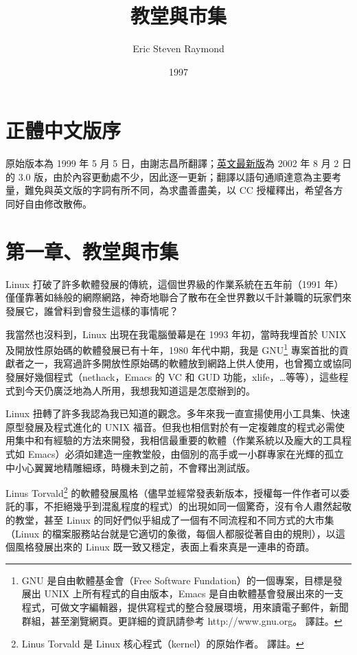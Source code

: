 \documentclass[12pt,]{article}
\title{教堂與市集}
\author{Eric Steven Raymond}
\date{1997}
\makeatletter
\newcommand*{\shifttext}[2]{%
  \settowidth{\@tempdima}{#2}%
  \makebox[\@tempdima]{\hspace*{#1}#2}%
}
\makeatother
\begin{document}
\maketitle

\newpage
\section{正體中文版序}

原始版本為 1999 年 5 月 5
日，由謝志昌所翻譯；\href{http://www.catb.org/esr/writings/homesteading/cathedral-bazaar/}{英文最新版}為
2002 年 8 月 2 日的 3.0
版，由於內容更動處不少，因此逐一更新；翻譯以語句通順達意為主要考量，難免與英文版的字詞有所不同，為求盡善盡美，以
CC 授權釋出，希望各方同好自由修改散佈。

\newpage
\section{第一章、教堂與市集}

Linux 打破了許多軟體發展的傳統，這個世界級的作業系統在五年前（1991
年）僅僅靠著如絲般的網際網路，神奇地聯合了散布在全世界數以千計兼職的玩家們來發展它，誰曾料到會發生這樣的事情呢？

我當然也沒料到，Linux 出現在我電腦螢幕是在 1993 年初，當時我埋首於 UNIX
及開放性原始碼的軟體發展已有十年，1980 年代中期，我是 GNU\footnote{GNU
  是自由軟體基金會（Free Software Fundation）的一個專案，目標是發展出 UNIX
  上所有程式的自由版本，Emacs
  是自由軟體基會發展出來的一支程式，可做文字編輯器，提供寫程式的整合發展環境，用來讀電子郵件，新聞群組，甚至瀏覽網頁。更詳細的資訊請參考
  http://www.gnu.org。 \shifttext{1pt}{---}\shifttext{-1pt}{---} 譯註。}
專案首批的貢獻者之一，我寫過許多開放性原始碼的軟體放到網路上供人使用，也曾獨立或協同發展好幾個程式（nethack，Emacs
的 VC 和 GUD
功能，xlife，\ldots{}等等），這些程式到今天仍廣泛地為人所用，我想我知道這是怎麼辦到的。

Linux
扭轉了許多我認為我已知道的觀念。多年來我一直宣揚使用小工具集、快速原型發展及程式進化的
UNIX
福音。但我也相信對於有一定複雜度的程式必需使用集中和有經驗的方法來開發，我相信最重要的軟體（作業系統以及龐大的工具程式如
Emacs）必須如建造一座教堂般，由個別的高手或一小群專家在光輝的孤立中小心翼翼地精雕細琢，時機未到之前，不會釋出測試版。

Linus Torvald\footnote{Linus Torvald 是 Linux
  核心程式（kernel）的原始作者。 \shifttext{1pt}{---}\shifttext{-1pt}{---} 譯註。}
的軟體發展風格（儘早並經常發表新版本，授權每一件作者可以委託的事，不拒絕幾乎到混亂程度的程式）的出現如同一個驚奇，沒有令人肅然起敬的教堂，甚至
Linux 的同好們似乎組成了一個有不同流程和不同方式的大市集（Linux
的檔案服務站台就是它適切的象徵，每個人都服從著自由的規則），以這個風格發展出來的
Linux 既一致又穩定，表面上看來真是一連串的奇蹟。
\end{document}
